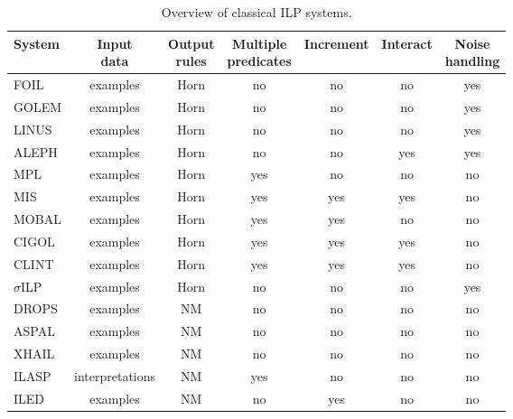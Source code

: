 \begin{table}[t]
\centering
\begin{tabular}{lcccccc}
\toprule %
System & \shortstack{Input \\data} &\shortstack{Output \\rules} & \shortstack{Multiple \\predicates}   &Increment & Interact & \shortstack{Noise \\handling}\\
\midrule
FOIL \cite{foil} & examples&Horn& no &no & no  &yes \\
GOLEM \cite{golem} &examples&Horn&  no &no & no & yes \\
LINUS \cite{linus} &examples&Horn&  no& no & no & yes \\
ALEPH \cite{aleph} &examples&Horn&  no &no & yes & yes \\
MPL \cite{mpl} &examples&Horn&  yes &no & no & no \\
MIS \cite{mis} &examples&Horn&  yes &yes & yes & no \\
MOBAL \cite{mobal} &examples&Horn&  yes &yes & no & no \\
CIGOL \cite{cigol} &examples&Horn&  yes &yes & yes & no \\
CLINT \cite{clint} &examples&Horn&  yes &yes & yes & no \\
$\sigma$ILP \cite{sigmailp}&examples&Horn&no&no&no&yes\\
DROPS \cite{CorapiRL10}&examples&NM&no&no&no&no\\
ASPAL \cite{ASPAL}&examples&NM&no&no&no&no\\
XHAIL \cite{XHAIL}&examples&NM&no&no&no&no\\
ILASP \cite{ILASP_system}&interpretations&NM&yes&no&no&no\\
ILED \cite{ILED}&examples&NM&no&yes&no&no\\

\bottomrule
\end{tabular}
\caption{Overview of classical ILP systems.}
\label{tab:ilp}
\end{table}